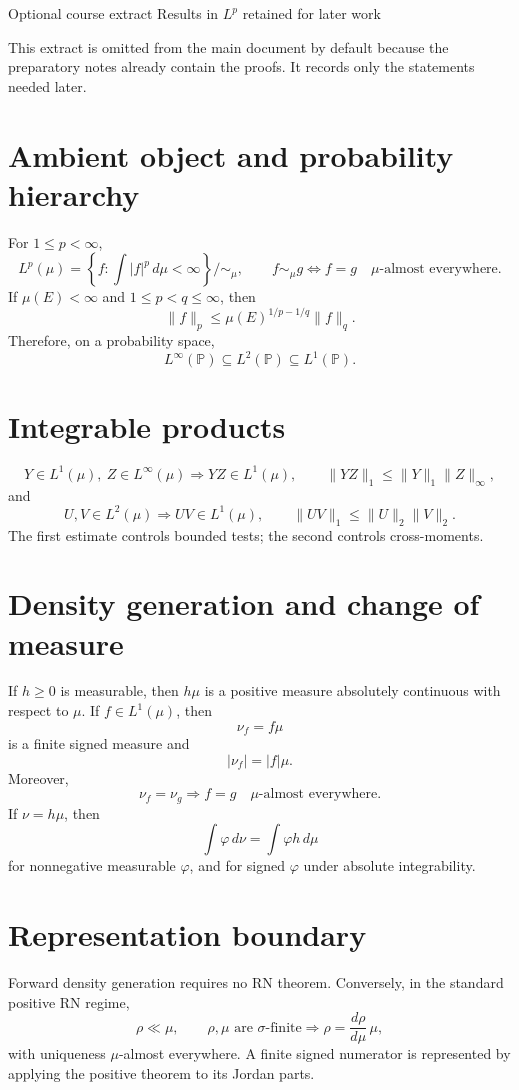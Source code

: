 \sheettitle
  {Optional course extract}
  {Results in $L^p$ retained for later work}

This extract is omitted from the main document by default because the preparatory notes already contain the proofs. It records only the statements needed later.

\section*{Ambient object and probability hierarchy}

For $1\le p<\infty$,
\[
L^p(\mu)
=
\left\{f:\int|f|^p\,d\mu<\infty\right\}\big/\!\sim_\mu,
\qquad
f\sim_\mu g
\Longleftrightarrow
f=g\quad\mu\text{-almost everywhere}.
\]
If $\mu(E)<\infty$ and $1\le p<q\le\infty$, then
\[
\|f\|_p
\le
\mu(E)^{1/p-1/q}\|f\|_q.
\]
Therefore, on a probability space,
\[
L^\infty(\mathbb P)
\subseteq
L^2(\mathbb P)
\subseteq
L^1(\mathbb P).
\]

\section*{Integrable products}

\[
Y\in L^1(\mu),\ Z\in L^\infty(\mu)
\Longrightarrow
YZ\in L^1(\mu),
\qquad
\|YZ\|_1\le\|Y\|_1\|Z\|_\infty,
\]
and
\[
U,V\in L^2(\mu)
\Longrightarrow
UV\in L^1(\mu),
\qquad
\|UV\|_1\le\|U\|_2\|V\|_2.
\]
The first estimate controls bounded tests; the second controls cross-moments.

\section*{Density generation and change of measure}

If $h\ge0$ is measurable, then $h\mu$ is a positive measure absolutely continuous with respect to $\mu$. If $f\in L^1(\mu)$, then
\[
\nu_f=f\mu
\]
is a finite signed measure and
\[
|\nu_f|=|f|\mu.
\]
Moreover,
\[
\nu_f=\nu_g
\Longrightarrow
f=g\quad\mu\text{-almost everywhere}.
\]
If $\nu=h\mu$, then
\[
\int\varphi\,d\nu
=
\int\varphi h\,d\mu
\]
for nonnegative measurable $\varphi$, and for signed $\varphi$ under absolute integrability.

\section*{Representation boundary}

Forward density generation requires no RN theorem. Conversely, in the standard positive RN regime,
\[
\rho\ll\mu,
\qquad
\rho,\mu\text{ are }\sigma\text{-finite}
\Longrightarrow
\rho=\frac{d\rho}{d\mu}\,\mu,
\]
with uniqueness $\mu$-almost everywhere. A finite signed numerator is represented by applying the positive theorem to its Jordan parts.
